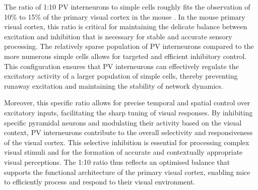 \documentclass[12pt]{article}
\begin{document}
The ratio of 1:10 PV interneurons to simple cells roughly fits the observation of 10\% to 15\% of the primary visual cortex in the mouse \autocite{meyerInhibitoryInterneuronsCortical2011}. In the mouse primary visual cortex, this ratio is critical for maintaining the delicate balance between excitation and inhibition that is necessary for stable and accurate sensory processing. The relatively sparse population of PV interneurons compared to the more numerous simple cells allows for targeted and efficient inhibitory control. This configuration ensures that PV interneurons can effectively regulate the excitatory activity of a larger population of simple cells, thereby preventing runaway excitation and maintaining the stability of network dynamics.

Moreover, this specific ratio allows for precise temporal and spatial control over excitatory inputs, facilitating the sharp tuning of visual responses. By inhibiting specific pyramidal neurons and modulating their activity based on the visual context, PV interneurons contribute to the overall selectivity and responsiveness of the visual cortex. This selective inhibition is essential for processing complex visual stimuli and for the formation of accurate and contextually appropriate visual perceptions. The 1:10 ratio thus reflects an optimised balance that supports the functional architecture of the primary visual cortex, enabling mice to efficiently process and respond to their visual environment.


\end{document}
